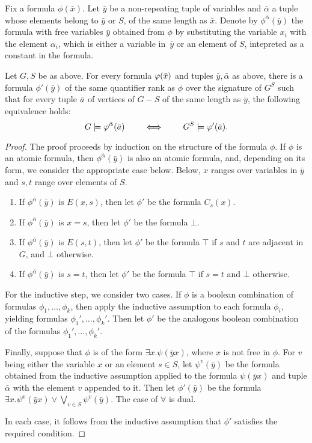 Fix a formula $\phi(\bar x)$.
Let $\bar y$ be a non-repeating tuple of variables and $\bar \alpha$ a tuple whose elements belong to $\bar y$ or $S$, of the same length as $\bar x$.
Denote by $\phi^{\bar \alpha}(\bar y)$ the formula with free variables $\bar y$ obtained from $\phi$ by substituting the variable $x_i$ with the element $\alpha_i$, 
which is either a variable in~$\bar y$  or an element of $S$, intepreted as a constant in the formula. 


\begin{lemma}\label{lem:remove-s}Let $G,S$ be as above.	
For every formula $\varphi(\bar{x})$ and tuples $\bar y,\bar\alpha$ as above,
there is a formula $\phi'(\bar y)$ 
of the same quantifier rank as $\phi$ over the signature of $G^S$ 
 such that for every tuple $\bar{a}$ of vertices of $G-S$
 of the same length as $\bar y$,
the following equivalence holds:
$$G\models\varphi^{\bar\alpha}(\bar{a})\qquad\iff\qquad G^S\models\varphi'(\bar{a}).$$
\end{lemma}
\begin{proof}
The proof proceeds by induction on the structure of the formula $\phi$. If $\phi$ is an atomic formula,
then $\phi^{\bar \alpha}(\bar y)$ is also an atomic formula, and, depending on its form, 
we consider the appropriate case below. Below, $x$ ranges over variables in $\bar y$
and $s,t$ range over elements of $S$.
\begin{enumerate}
	\item If $\phi^{\bar \alpha}(\bar y)$ is $E(x,s)$, 
then let $\phi'$ be the formula $C_s(x)$.
\item If $\phi^{\bar \alpha}(\bar y)$ is $x=s$, then let $\phi'$
be the formula $\bot$. 
	\item If $\phi^{\bar \alpha}(\bar y)$ is $E(s,t)$, 
then let $\phi'$ be the formula $\top$ if $s$ and $t$ are adjacent in $G$, and $\bot$ otherwise. 
	\item If $\phi^{\bar \alpha}(\bar y)$ is $s=t$, 
then let $\phi'$ be the formula $\top$ if $s=t$ and $\bot$ otherwise. 
\end{enumerate}

For the inductive step, we consider two cases.
If $\phi$ is a boolean combination of formulas $\phi_1,\ldots,\phi_k$, then 
apply the inductive assumption to each formula $\phi_i$,
yielding formulas $\phi_1',\ldots,\phi_k'$. Then let $\phi'$ be the analogous boolean combination of the formulas $\phi_1',\ldots,\phi_k'$.

Finally, suppose that $\phi$ is of the form $\exists x.\psi(\bar y x)$, where $x$ is not free in $\phi$. For $v$ being either the variable $x$ 
or an element $s\in S$, 
let $\psi^v(\bar y)$ be the formula obtained from the inductive assumption applied to the formula $\psi(\bar y x)$ 
and tuple $\bar \alpha$ with the element $v$ appended to it.
Then let $\phi'(\bar y)$
be the formula $\exists x.\psi^x(\bar yx)\lor \bigvee_{v\in S}\psi^v(\bar y)$.
The case of $\forall$ is dual.

In each case, it follows from the inductive assumption that $\phi'$ 
satisfies the required condition.
\end{proof}

